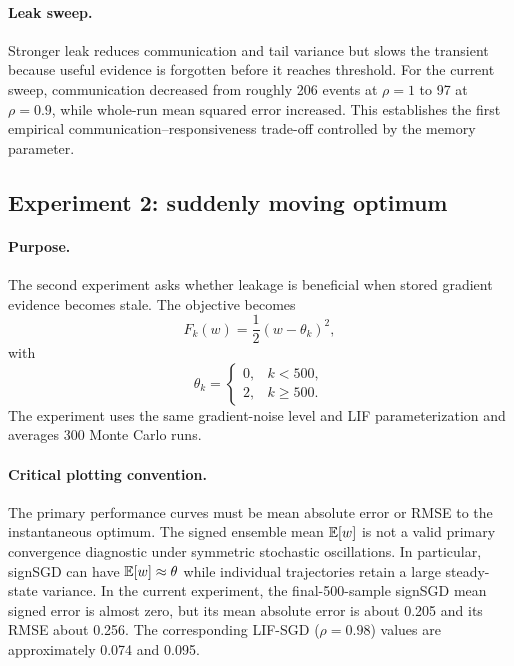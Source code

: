 \paragraph{Leak sweep.}
Stronger leak reduces communication and tail variance but slows the transient because useful evidence is forgotten before it reaches threshold. For the current sweep, communication decreased from roughly 206 events at $\rho=1$ to 97 at $\rho=0.9$, while whole-run mean squared error increased. This establishes the first empirical communication--responsiveness trade-off controlled by the memory parameter.

\subsection{Experiment 2: suddenly moving optimum}

\paragraph{Purpose.}
The second experiment asks whether leakage is beneficial when stored gradient evidence becomes stale. The objective becomes
\begin{equation}
  F_k(w)=\frac12(w-\theta_k)^2,
\end{equation}
with
\begin{equation}
  \theta_k=\begin{cases}
  0,&k<500,\\
  2,&k\geq500.
  \end{cases}
\end{equation}
The experiment uses the same gradient-noise level and LIF parameterization and averages 300 Monte Carlo runs.

\paragraph{Critical plotting convention.}
The primary performance curves must be mean absolute error or RMSE to the instantaneous optimum. The signed ensemble mean $\mathbb{E}[w]$ is not a valid primary convergence diagnostic under symmetric stochastic oscillations. In particular, signSGD can have $\mathbb{E}[w]\approx\theta$ while individual trajectories retain a large steady-state variance. In the current experiment, the final-500-sample signSGD mean signed error is almost zero, but its mean absolute error is about 0.205 and its RMSE about 0.256. The corresponding LIF-SGD ($\rho=0.98$) values are approximately 0.074 and 0.095.

